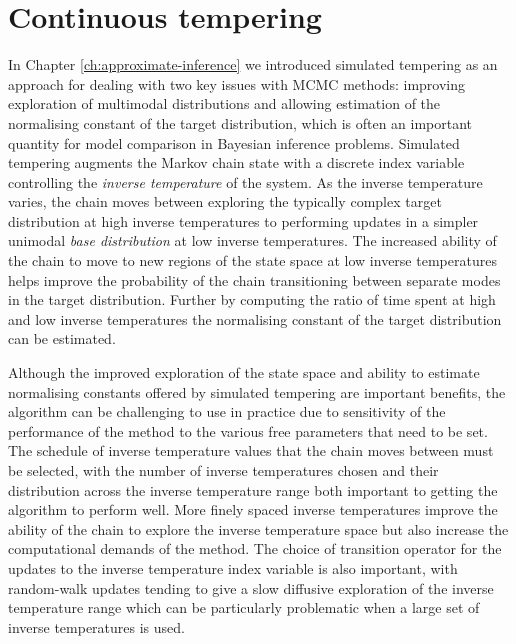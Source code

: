 \chapter{Continuous tempering}\label{ch:continuous-tempering}

In Chapter \ref{ch:approximate-inference} we introduced simulated tempering \citep{marinari1992simulated} as an approach for dealing with two key issues with \ac{MCMC} methods: improving exploration of multimodal distributions and allowing estimation of the normalising constant of the target distribution, which is often an important quantity for model comparison in Bayesian inference problems. Simulated tempering augments the Markov chain state with a discrete index variable controlling the \emph{inverse temperature} of the system. As the inverse temperature varies, the chain moves between exploring the typically complex target distribution at high inverse temperatures to performing updates in a simpler unimodal \emph{base distribution} at low inverse temperatures. The increased ability of the chain to move to new regions of the state space at low inverse temperatures helps improve the probability of the chain transitioning between separate modes in the target distribution. Further by computing the ratio of time spent at high and low inverse temperatures the normalising constant of the target distribution can be estimated.

Although the improved exploration of the state space and ability to estimate normalising constants offered by simulated tempering are important benefits, the algorithm can be challenging to use in practice due to sensitivity of the performance of the method to the various free parameters that need to be set. The schedule of inverse temperature values that the chain moves between must be selected, with the number of inverse temperatures chosen and their distribution across the inverse temperature range both important to getting the algorithm to perform well. More finely spaced inverse temperatures improve the ability of the chain to explore the inverse temperature space but also increase the computational demands of the method. The choice of transition operator for the updates to the inverse temperature index variable is also important, with random-walk updates tending to give a slow diffusive exploration of the inverse temperature range which can be particularly problematic when a large set of inverse temperatures is used.

